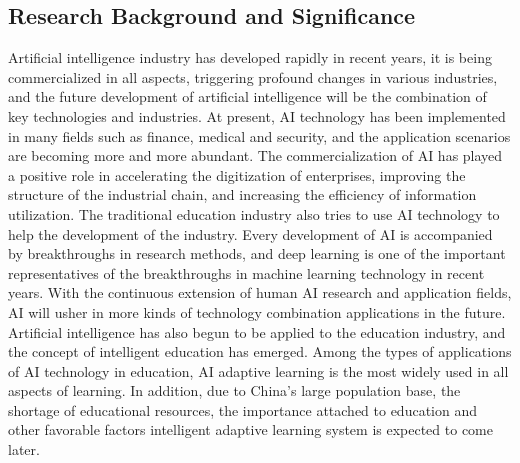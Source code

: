 \documentclass[11pt,en]{elegantpaper}
\begin{document}
\subsection{Research Background and Significance}
Artificial intelligence industry has developed rapidly in recent years, it is being commercialized in all aspects, triggering profound changes in various industries, and the future development of artificial intelligence will be the combination of key technologies and industries.\cite{cui2018performance} At present, AI technology has been implemented in many fields such as finance, medical and security, and the application scenarios are becoming more and more abundant. The commercialization of AI has played a positive role in accelerating the digitization of enterprises, improving the structure of the industrial chain, and increasing the efficiency of information utilization. The traditional education industry also tries to use AI technology to help the development of the industry. Every development of AI is accompanied by breakthroughs in research methods, and deep learning is one of the important representatives of the breakthroughs in machine learning technology in recent years. With the continuous extension of human AI research and application fields, AI will usher in more kinds of technology combination applications in the future. Artificial intelligence has also begun to be applied to the education industry, and the concept of intelligent education has emerged. Among the types of applications of AI technology in education, AI adaptive learning is the most widely used in all aspects of learning. In addition, due to China's large population base, the shortage of educational resources, the importance attached to education and other favorable factors intelligent adaptive learning system is expected to come later. 
\end{document}
